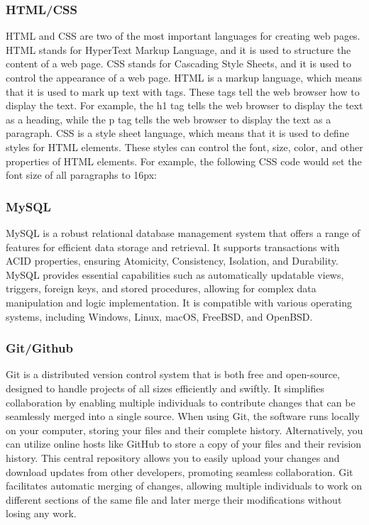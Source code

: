 \documentclass{article}
\begin{document}
\subsubsection{HTML/CSS}
HTML and CSS are two of the most important languages for creating web pages. HTML stands for HyperText Markup Language, and it is used to structure the content of a web page. CSS stands for Cascading Style Sheets, and it is used to control the appearance of a web page.
HTML is a markup language, which means that it is used to mark up text with tags. These tags tell the web browser how to display the text. For example, the h1 tag tells the web browser to display the text as a heading, while the p tag tells the web browser to display the text as a paragraph.
CSS is a style sheet language, which means that it is used to define styles for HTML elements. These styles can control the font, size, color, and other properties of HTML elements. For example, the following CSS code would set the font size of all paragraphs to 16px:

\subsubsection{MySQL}
MySQL is a robust relational database management system that offers a range of features for efficient data storage and retrieval. It supports transactions with ACID properties, ensuring Atomicity, Consistency, Isolation, and Durability. MySQL provides essential capabilities such as automatically updatable views, triggers, foreign keys, and stored procedures, allowing for complex data manipulation and logic implementation. It is compatible with various operating systems, including Windows, Linux, macOS, FreeBSD, and OpenBSD. 
\subsubsection{Git/Github}
Git is a distributed version control system that is both free and open-source, designed to handle projects of all sizes efficiently and swiftly. It simplifies collaboration by enabling multiple individuals to contribute changes that can be seamlessly merged into a single source. When using Git, the software runs locally on your computer, storing your files and their complete history. Alternatively, you can utilize online hosts like GitHub to store a copy of your files and their revision history. This central repository allows you to easily upload your changes and download updates from other developers, promoting seamless collaboration. Git facilitates automatic merging of changes, allowing multiple individuals to work on different sections of the same file and later merge their modifications without losing any work.
\end{document}
